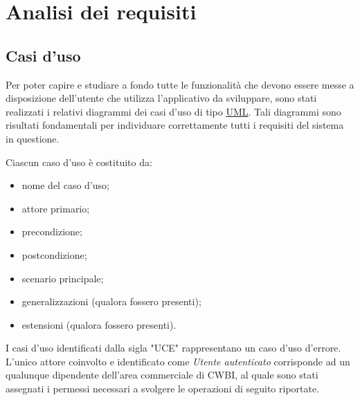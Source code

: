\chapter{Analisi dei requisiti}
\label{cap:analisi-requisiti}


\setlength{\parskip}{3ex}

\section{Casi d'uso}
Per poter capire e studiare a fondo tutte le funzionalità che devono essere messe a disposizione dell'utente che utilizza l'applicativo da sviluppare, sono stati realizzati i relativi diagrammi dei casi d'uso di tipo {\hyperref[para:uml-definition]{UML}}\glsfirstoccur. Tali diagrammi sono risultati fondamentali per individuare correttamente tutti i requisiti del sistema in questione.

\setlength{\parskip}{3ex}

\noindent Ciascun caso d'uso è costituito da:
\begin{itemize}
\item nome del caso d'uso;
\item attore primario;
\item precondizione;
\item postcondizione;
\item scenario principale;
\item generalizzazioni (qualora fossero presenti);
\item estensioni (qualora fossero presenti).
\end{itemize}

\setlength{\parskip}{3ex}

\noindent I casi d'uso identificati dalla sigla "UCE" rappresentano un caso d'uso d'errore.
L'unico attore coinvolto e identificato come \textit{Utente autenticato} corrisponde ad un qualunque dipendente dell'area commerciale di CWBI, al quale sono stati assegnati i permessi necessari a svolgere le operazioni di seguito riportate.  

\pagebreak

